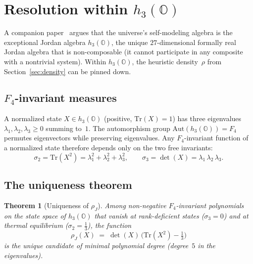 \documentclass[12pt]{article}
\newtheorem{theorem}{Theorem}
\theoremstyle{remark}
\begin{document}

\section{Resolution within $h_3(\mathbb{O})$}\label{sec:h3o}

A companion paper~\cite{ehrlich2026sm} argues that the universe's
self-modeling algebra is the exceptional Jordan algebra
$h_3(\mathbb{O})$, the unique $27$-dimensional formally real Jordan
algebra that is non-composable (it cannot participate in any composite
with a nontrivial system).  Within $h_3(\mathbb{O})$, the heuristic
density~$\rho$ from Section~\ref{sec:density} can be pinned down.

\subsection{$F_4$-invariant measures}

A normalized state $X \in h_3(\mathbb{O})$ (positive,
$\mathrm{Tr}(X) = 1$) has three eigenvalues
$\lambda_1, \lambda_2, \lambda_3 \geq 0$ summing to~$1$.  The
automorphism group $\mathrm{Aut}(h_3(\mathbb{O})) = F_4$ permutes
eigenvectors while preserving eigenvalues.  Any $F_4$-invariant
function of a normalized state therefore depends only on the two free
invariants:
\[
  \sigma_2 = \mathrm{Tr}(X^2)
    = \lambda_1^2 + \lambda_2^2 + \lambda_3^2,
  \qquad
  \sigma_3 = \det(X) = \lambda_1\,\lambda_2\,\lambda_3.
\]

\subsection{The uniqueness theorem}

\begin{theorem}[Uniqueness of $\rho_J$]\label{thm:rhoJ}
Among non-negative $F_4$-invariant polynomials on the state space of
$h_3(\mathbb{O})$ that vanish at rank-deficient states
($\sigma_3 = 0$) and at thermal equilibrium
($\sigma_2 = \tfrac{1}{3}$), the function
\begin{equation}\label{eq:rhoJ}
  \rho_J(X) \;=\; \det(X)\,\bigl(\mathrm{Tr}(X^2)
    - \tfrac{1}{3}\bigr)
\end{equation}
is the unique candidate of minimal polynomial degree (degree~$5$ in
the eigenvalues).
\end{theorem}
\end{document}
